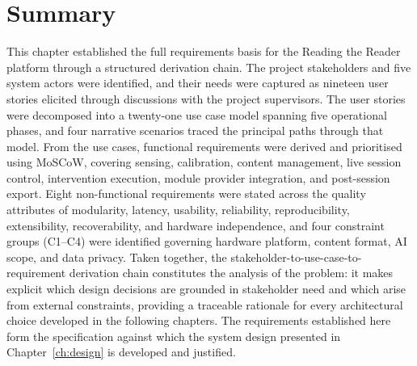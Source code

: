 \section{Summary}
\label{sec:requirements-summary}

This chapter established the full requirements basis for the Reading the Reader platform through a structured derivation chain.
The project stakeholders and five system actors were identified, and their needs were captured as nineteen user stories elicited through discussions with the project supervisors.
The user stories were decomposed into a twenty-one use case model spanning five operational phases, and four narrative scenarios traced the principal paths through that model.
From the use cases, functional requirements were derived and prioritised using MoSCoW, covering sensing, calibration, content management, live session control, intervention execution, module provider integration, and post-session export.
Eight non-functional requirements were stated across the quality attributes of modularity, latency, usability, reliability, reproducibility, extensibility, recoverability, and hardware independence, and four constraint groups (C1–C4) were identified governing hardware platform, content format, AI scope, and data privacy.
Taken together, the stakeholder-to-use-case-to-requirement derivation chain constitutes the analysis of the problem: it makes explicit which design decisions are grounded in stakeholder need and which arise from external constraints, providing a traceable rationale for every architectural choice developed in the following chapters.
The requirements established here form the specification against which the system design presented in Chapter~\ref{ch:design} is developed and justified.
